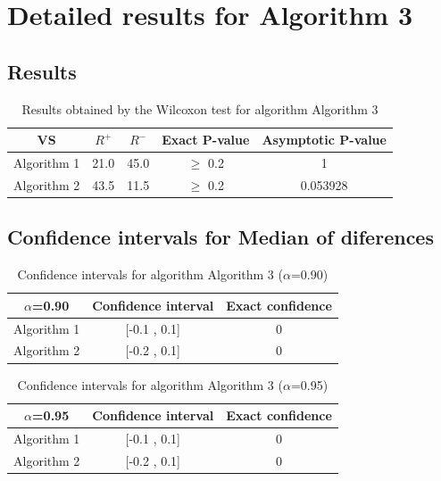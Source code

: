 \documentclass[a4paper,10pt]{article}
\begin{document}
 \clearpage 


\section{Detailed results for Algorithm 3}


\subsection{Results}

\begin{table}[!htp]
\centering\small
\begin{tabular}{
|c|c|c|c|c|}
\hline
 VS & $R^{+}$ & $R^{-}$ & Exact P-value & Asymptotic P-value \\ \hline 
Algorithm 1 & 21.0 & 45.0 & $\geq$ 0.2 & 1\\ \hline 
Algorithm 2 & 43.5 & 11.5 & $\geq$ 0.2 & 0.053928\\ \hline 

\end{tabular}
\caption{Results obtained by the Wilcoxon test for algorithm Algorithm 3}
\end{table}

\subsection{Confidence intervals for Median of diferences}

\begin{table}[!htp]
\centering\small
\begin{tabular}{
|c|c|c|}
\hline
 $\alpha$=0.90 & Confidence interval & Exact confidence \\ \hline 
Algorithm 1 & [-0.1 , 0.1] & 0\\ \hline 
Algorithm 2 & [-0.2 , 0.1] & 0\\ \hline 

\end{tabular}
\caption{Confidence intervals for algorithm Algorithm 3 ($\alpha$=0.90)}
\end{table}
\begin{table}[!htp]
\centering\small
\begin{tabular}{
|c|c|c|}
\hline
 $\alpha$=0.95 & Confidence interval & Exact confidence \\ \hline 
Algorithm 1 & [-0.1 , 0.1] & 0\\ \hline 
Algorithm 2 & [-0.2 , 0.1] & 0\\ \hline 

\end{tabular}
\caption{Confidence intervals for algorithm Algorithm 3 ($\alpha$=0.95)}
\end{table}

 \clearpage 
\end{document}
